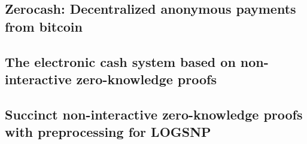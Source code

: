 \subsection{Zerocash: Decentralized anonymous payments from bitcoin\cite{sasson2014zerocash}}


\subsection{The electronic cash system based on non-interactive zero-knowledge proofs\cite{doi:10.1080/00207160.2014.933816}}


\subsection{Succinct non-interactive zero-knowledge proofs with preprocessing for LOGSNP\cite{kalai2006succinct}}


